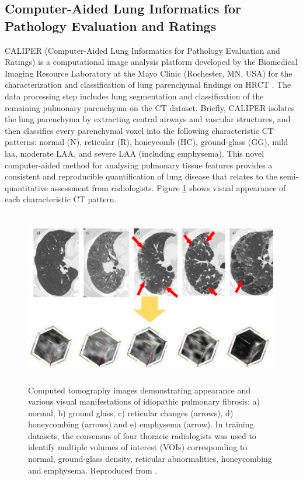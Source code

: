 \subsection{Computer-Aided Lung Informatics for Pathology Evaluation and Ratings} \label{CALIPERIntroduction}
CALIPER (Computer-Aided Lung Informatics for Pathology Evaluation and Ratings) is a computational image analysis platform developed by the Biomedical Imaging Resource Laboratory at the Mayo Clinic (Rochester, MN, USA) for the characterization and classification of lung parenchymal findings on HRCT \citep{maldonado2013automated,bartholmai2013quantitative,raghunath2014quantitative}. The data processing step includes lung segmentation and classification of the remaining pulmonary parenchyma on the CT dataset. Briefly, CALIPER isolates the lung parenchyma by extracting central airways and vascular structures, and then classifies every parenchymal voxel into the following characteristic CT patterns: normal (N), reticular (R), honeycomb (HC), ground-glass (GG), mild \gls{laa}, moderate LAA, and severe LAA (including emphysema). This novel computer-aided method for analysing pulmonary tissue features provides a consistent and reproducible quantification of lung disease that relates to the semi-quantitative assessment from radiologists\citep{maldonado2013automated}. Figure \ref{fig:CALIPERPatterns} shows visual appearance of each characteristic CT pattern.

\begin{figure}[htbp]
  \centering 
  \includegraphics[height=3.0in]{QuantitativeAnalysis/Image/CALIPERPatterns.png}
  \caption{Computed tomography images demonstrating appearance and various visual manifestations of idiopathic pulmonary fibrosis: a) normal, b) ground glass, c) reticular changes (arrows), d) honeycombing (arrows) and e) emphysema (arrow). In training datasets, the consensus of four thoracic radiologists was used to identify multiple volumes of interest (VOIs) corresponding to normal, ground-glass density, reticular abnormalities, honeycombing and emphysema. Reproduced from \citep{maldonado2013automated}.}
  \label{fig:CALIPERPatterns}
\end{figure}

